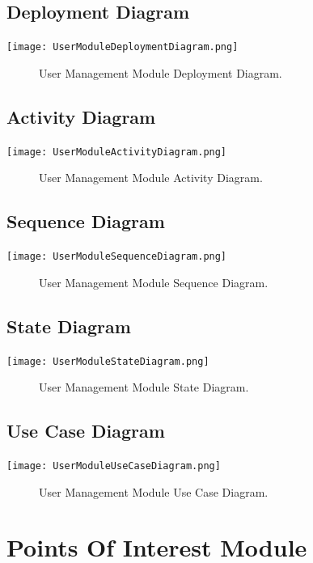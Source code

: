 \documentclass[12pt]{article}
\begin{document}
    \subsection{Deployment Diagram}
        \texttt{[image: UserModuleDeploymentDiagram.png]}
        \begin{figure}[h]
            \caption{User Management Module Deployment Diagram.}
        \end{figure}
        
    \subsection{Activity Diagram}
        \texttt{[image: UserModuleActivityDiagram.png]}
        \begin{figure}[h]
            \caption{User Management Module Activity Diagram.}
        \end{figure}

    \subsection{Sequence Diagram}
        \texttt{[image: UserModuleSequenceDiagram.png]}
        \begin{figure}[h]
            \caption{User Management Module Sequence Diagram.}
        \end{figure}

	
	\subsection{State Diagram}
       \texttt{[image: UserModuleStateDiagram.png]}
        \begin{figure}[h]
        	\caption{User Management Module State Diagram.}
        \end{figure}
	
	\subsection{Use Case Diagram}
        	\texttt{[image: UserModuleUseCaseDiagram.png]}
        	\begin{figure}[h]
        		\caption{User Management Module Use Case Diagram.}
        	\end{figure}
        	
   
   \section{Points Of Interest Module}
	
\end{document}
